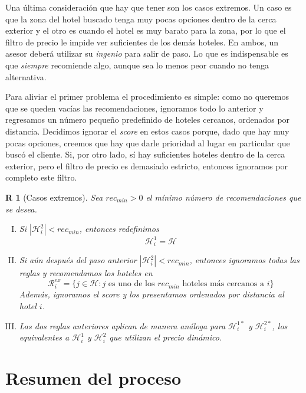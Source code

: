 \documentclass[12pt]{report}
\newcommand{\HH}{\mathcal{H}}
\newcommand{\RR}{\mathcal{R}}
\newtheorem{regla}{R}%
\begin{document}
Una última consideración que hay que tener son los casos extremos. Un caso es que la zona del hotel buscado tenga muy pocas opciones dentro de la cerca exterior y el otro es cuando el hotel es muy barato para la zona, por lo que el filtro de precio le impide ver suficientes de los demás hoteles. En ambos, un asesor deberá utilizar su \emph{ingenio} para salir de paso. Lo que es indispensable es que \emph{siempre} recomiende algo, aunque sea lo menos peor cuando no tenga alternativa.

Para aliviar el primer problema el procedimiento es simple: como no queremos que se queden vacías las recomendaciones, ignoramos todo lo anterior y regresamos un número pequeño predefinido de hoteles cercanos, ordenados por distancia. Decidimos ignorar el \emph{score} en estos casos porque, dado que hay muy pocas opciones, creemos que hay que darle prioridad al lugar en particular que buscó el cliente. Si, por otro lado, sí hay suficientes hoteles dentro de la cerca exterior, pero el filtro de precio es demasiado estricto, entonces ignoramos por completo este filtro.
\begin{regla}[Casos extremos] \label{r:casosextremos}
Sea $rec_{min} > 0$ el mínimo número de recomendaciones que se desea.
\begin{enumerate}[(I)]
	\item Si $|\HH_i^2| < rec_{min}$, entonces redefinimos
		\[
			\HH_i^1 = \HH
		\]
	\item Si aún después del paso anterior $|\HH_i^2| < rec_{min}$, entonces ignoramos todas las reglas y recomendamos los hoteles en
	\[
		\RR_i^{ex} = \{j \in \HH : j \text{ es uno de los } rec_{min} \text{ hoteles más cercanos a } i\}
	\]
	Además, ignoramos el score y los presentamos ordenados por distancia al hotel $i$.
	\item Las dos reglas anteriores aplican de manera análoga para $\HH_i^{1*}$ y $\HH_i^{2*}$, los equivalentes a $\HH_i^{1}$ y $\HH_i^{2}$ que utilizan el precio dinámico.
\end{enumerate}
\end{regla}

\section{Resumen del proceso}
\end{document}
